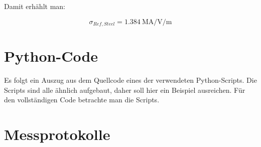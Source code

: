 Damit erh\"ahlt man:

\begin{equation*}
    \sigma_{Ref,Steel} = \SI{1.384}{\mega\ampere\per\volt\per\meter}
\end{equation*}


\clearpage
\section{Python-Code}
\label{app:python}

Es   folgt   ein   Auszug   aus    dem   Quellcode   eines   der   verwendeten
Python-Scripts. Die Scripts  sind alle  \"ahnlich  aufgebaut, daher  soll hier
ein  Beispiel ausreichen. F\"ur  den  vollst\"andigen Code  betrachte man  die
Scripts.


\clearpage
\section{Messprotokolle}
\label{app:protocols}

